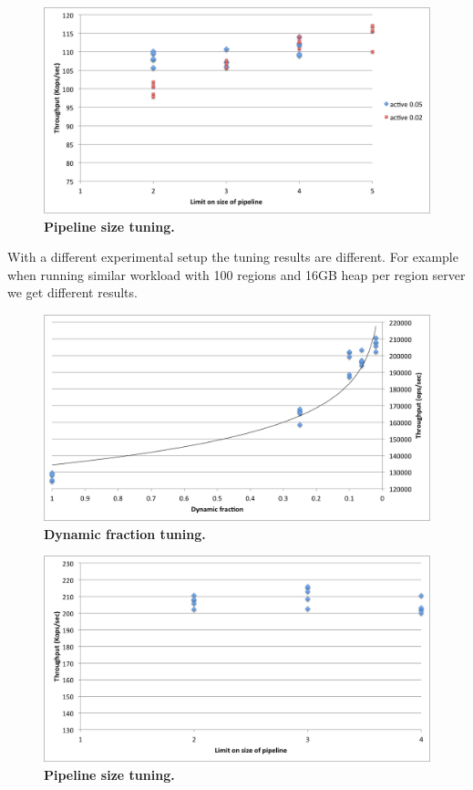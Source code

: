 \begin{figure}[htb]
\includegraphics[width=\figw]{Figs/pipeline-1.png}
\caption{{\bf Pipeline size tuning.} 
}
\label{fig:pipeline}
\end{figure}

With a different experimental setup the tuning results are different.
For example when running similar workload with 100 regions and 16GB heap per region server we get different results.
\begin{figure}[htb]
\includegraphics[width=\figw]{Figs/dynamic-fraction-2.png}
\caption{{\bf Dynamic fraction tuning.} 
}
\label{fig:dynamic-fraction-2}
\end{figure}

\begin{figure}[htb]
\includegraphics[width=\figw]{Figs/pipeline-2.png}
\caption{{\bf Pipeline size tuning.} 
}
\label{fig:pipeline-2}
\end{figure}

